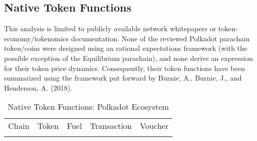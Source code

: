 \documentclass[11pt]{article}
\begin{document}
\subsection{Native Token Functions}

This analysis is limited to publicly available network whitepapers or token-economy/tokenomics documentation. None of the reviewed Polkadot parachain token/coins were designed using an rational expectations framework (with the possible exception of the Equilibrium parachain), and none derive an expression for their token price dynamics. Consequently, their token functions have been summarized using the framework put forward by Burnie, A., Burnie, J., and Henderson, A. (2018)\autocite{burnie18}.

\begin{table}[!ht]
\caption{Native Token Functions: Polkadot Ecosystem} %
\centering %
\begin{tabular}{l l c c c} %
\hline\hline %
Chain & Token & Fuel & Transaction & Voucher \\ [0.5ex]
\\ [0.5ex]
\hline %


\end{tabular}
\end{table}
\end{document}
